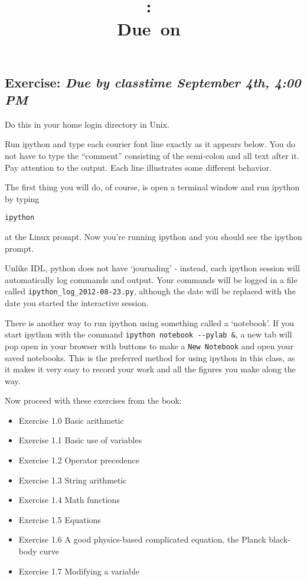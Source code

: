 \documentclass{article}
\title{\vspace{2in}\textmd{\textbf{\hmwkClass:\ \hmwkTitle}}\\\normalsize\vspace{0.1in}\small{Due\ on\ \hmwkDueDate}\\\vspace{0.1in}\large{}\vspace{3in}}
\date{}
\newcommand{\hmwkDueDate}{September 4th, 4:00 PM}
\begin{document}
\begin{spacing}{1.0}
\newpage


\section{\textbf{Exercise:} \emph{  Due by classtime \hmwkDueDate}}
\par

\noindent Do this in your home login directory in Unix.

\noindent Run ipython and type each courier font line exactly as it appears
below.  You do not have to type the “comment” consisting of the semi-colon and
all text after it.  Pay attention to the output.  Each line illustrates some
different behavior.

\noindent The first thing you will do, of course, is open a terminal window and run ipython by typing

\texttt{ipython}

at the Linux prompt.  Now you’re running ipython and you should see the ipython prompt.

Unlike IDL, python does not have `journaling' - instead, each ipython session
will automatically log commands and output.  Your commands will be logged in a
file called \verb|ipython_log_2012-08-23.py|, although the date will be
replaced with the date you started the interactive session.

There is another way to run ipython using something called a `notebook'.  If
you start ipython with the command \verb|ipython notebook --pylab &|, a new tab
will pop open in your browser with buttons to make a \verb|New Notebook| and
open your saved notebooks.  This is the preferred method for using ipython in
this class, as it makes it very easy to record your work and all the figures
you make along the way.

Now proceed with these exercises from the book:

\begin{itemize}
    \item Exercise 1.0 Basic arithmetic
    \item Exercise 1.1 Basic use of variables
    \item Exercise 1.2 Operator precedence
    \item Exercise 1.3 String arithmetic
    \item Exercise 1.4 Math functions
    \item Exercise 1.5 Equations
    \item Exercise 1.6 A good physics-based complicated equation, the Planck black-body curve
    \item Exercise 1.7 Modifying a variable
\end{itemize}


\end{spacing}
\end{document}

